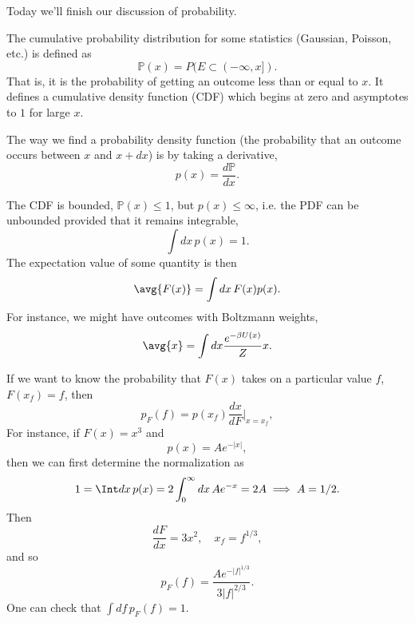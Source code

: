 Today we'll finish our discussion of probability.

The cumulative probability distribution for some statistics (Gaussian, Poisson, etc.) is defined as
\begin{equation}
    \mathbb P(x) = P(E\subset (-\infty,x]).
\end{equation}
That is, it is the probability of getting an outcome less than or equal to $x$. It defines a cumulative density function (CDF) which begins at zero and asymptotes to $1$ for large $x$.

The way we find a probability density function (the probability that an outcome occurs between $x$ and $x+dx$) is by taking a derivative,
\begin{equation}
    p(x) = \frac{d\mathbb P}{dx}.
\end{equation}

The CDF is bounded, $\mathbb P(x) \leq 1$, but $p(x)\leq \infty$, i.e. the PDF can be unbounded provided that it remains integrable,
\begin{equation}
    \int dx\, p(x) =1.
\end{equation}
The expectation value of some quantity is then
\begin{equation}
    \avg{F(x)}=\int dx \, F(x) p(x).
\end{equation}
For instance, we might have outcomes with Boltzmann weights,
\begin{equation}
    \avg{x} = \int dx \frac{e^{-\beta U(x)}}{Z}x.
\end{equation}

If we want to know the probability that $F(x)$ takes on a particular value $f$, $F(x_f)=f$, then
\begin{equation}
    p_F(f) = p(x_f) \frac{dx}{dF}|_{x=x_f},
\end{equation}
For instance, if $F(x)=x^3$ and 
\begin{equation}
    p(x) = Ae^{-|x|},
\end{equation}
then we can first determine the normalization as
\begin{equation}
    1 = \Int dx \, p(x) = 2 \int_0^\infty dx \,Ae^{-x} =2A \implies A=1/2.
\end{equation}
Then
\begin{equation}
    \frac{dF}{dx} = 3x^2, \quad x_f = f^{1/3},
\end{equation}
and so
\begin{equation}
    p_F(f) = \frac{Ae^{-|f|^{1/3}}}{3|f|^{2/3}}.
\end{equation}
One can check that $\int df \,p_F(f)=1.$

